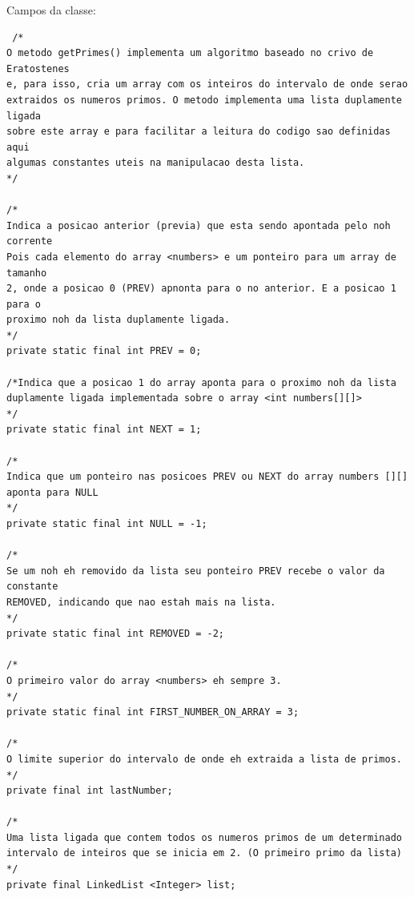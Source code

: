 \documentclass[a4paper,12pt,openany]{book}
\begin{document}
{\begin{minipage}{18cm}
 
	
	\end{minipage}

}%

\newpage

Campos da classe:

\begin{lstlisting}
 /*
O metodo getPrimes() implementa um algoritmo baseado no crivo de Eratostenes
e, para isso, cria um array com os inteiros do intervalo de onde serao 
extraidos os numeros primos. O metodo implementa uma lista duplamente ligada
sobre este array e para facilitar a leitura do codigo sao definidas aqui
algumas constantes uteis na manipulacao desta lista.
*/

/*
Indica a posicao anterior (previa) que esta sendo apontada pelo noh corrente
Pois cada elemento do array <numbers> e um ponteiro para um array de tamanho
2, onde a posicao 0 (PREV) apnonta para o no anterior. E a posicao 1 para o
proximo noh da lista duplamente ligada.
*/
private static final int PREV = 0;

/*Indica que a posicao 1 do array aponta para o proximo noh da lista 
duplamente ligada implementada sobre o array <int numbers[][]>
*/
private static final int NEXT = 1;

/*
Indica que um ponteiro nas posicoes PREV ou NEXT do array numbers [][]
aponta para NULL
*/
private static final int NULL = -1;

/*
Se um noh eh removido da lista seu ponteiro PREV recebe o valor da constante
REMOVED, indicando que nao estah mais na lista.
*/
private static final int REMOVED = -2;

/*
O primeiro valor do array <numbers> eh sempre 3.
*/
private static final int FIRST_NUMBER_ON_ARRAY = 3;

/*
O limite superior do intervalo de onde eh extraida a lista de primos.
*/
private final int lastNumber;

/*
Uma lista ligada que contem todos os numeros primos de um determinado
intervalo de inteiros que se inicia em 2. (O primeiro primo da lista)
*/
private final LinkedList <Integer> list;
\end{lstlisting}

\end{document}
